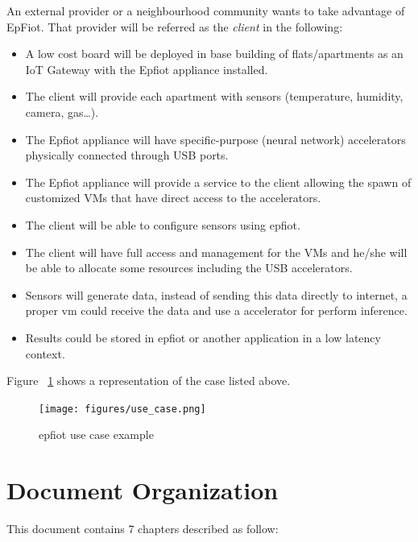 An external provider or a neighbourhood community wants to take advantage of EpFiot. That provider will be referred as the {\em client} in the following:
\begin{itemize}
  \item A low cost board will be deployed in base building of flats/apartments as an IoT Gateway with the Epfiot appliance installed.
  \item The client will provide each apartment with sensors (temperature, humidity, camera, gas\ldots).
  \item The Epfiot appliance will have specific-purpose (neural network) accelerators physically connected through USB ports.
  \item The Epfiot appliance will provide a service to the client allowing the spawn of customized VMs that have direct access to the accelerators.
  \item The client will be able to configure sensors using epfiot.
  \item The client will have full access and management for the VMs and he/she will be able to allocate some resources including the USB accelerators.
  \item Sensors will generate data, instead of sending this data directly to internet, a proper vm could receive the data and use a accelerator for perform inference.
  \item Results could be stored in epfiot or another application in a low latency context.
\end{itemize}

Figure ~\ref{figure1.2} shows a representation of the case listed above.

\begin{figure}[h]%
    \texttt{[image: figures/use\_case.png]}
~\caption{epfiot use case example}
\label{figure1.2}
\end{figure}

\section{Document Organization}
\label{makereference1.3}

This document contains 7 chapters described as follow:

